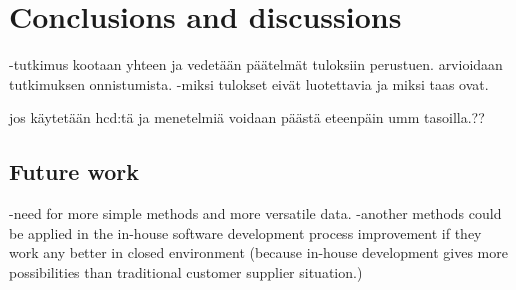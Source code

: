 \documentclass[12pt,a4paper,oneside,pdftex]{report}
\begin{document}




% 


% 










% 

\chapter{Conclusions and discussions}
\label{chapter:conclusion}
-tutkimus kootaan yhteen ja vedetään päätelmät tuloksiin perustuen. 
arvioidaan tutkimuksen onnistumista.
-miksi tulokset eivät luotettavia ja miksi taas ovat.

jos käytetään hcd:tä ja menetelmiä voidaan päästä eteenpäin umm tasoilla.??
        \section{Future work}
	\label{sec:future}
	-need for more simple methods and more versatile data.
	-another methods could be applied in the in-house software development process improvement if they work any better in closed environment (because in-house development gives more possibilities than traditional customer supplier situation.)
\end{document}
